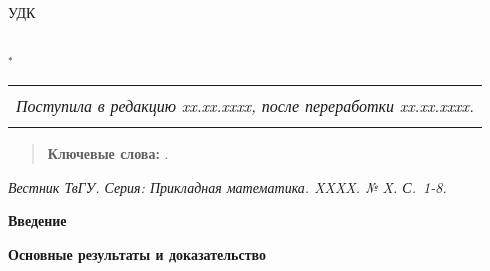 \documentclass[a4paper,twoside]{article}
\newcommand{\firstheader}[1]{\noindent\textbf{#1}\nopagebreak\bigskip}
\newcommand{\header}[1]{\bigskip\medskip\noindent\textbf{#1}\nopagebreak\bigskip}
\theoremstyle{theorem}
\theoremstyle{remark}
\newcommand{\pages}{1-8}
\begin{document}
\pagestyle{headings}
\makeatletter
\renewcommand{\@evenhead}{\raisebox{0pt}[\headheight][0pt]{\vbox{\hbox to\textwidth{\thepage\hfill \strut {\small }}\hrule}}}
\renewcommand{\@oddhead}{\raisebox{0pt}[\headheight][0pt]{\vbox{\hbox to\textwidth{{\small  }\hfill \strut\thepage}\hrule}}}
\makeatother

\thispagestyle{plain}
УДК 
\begin{center}
    {\bf }
\vspace{4mm}\par
    {\bf }\\
    $^{*}$ \\
\end{center}
\vspace{2mm}\par

\begin{center}
\renewcommand{\arraystretch}{0}
\begin{tabular}{c}
\hline
\rule{0pt}{2mm}\\
\small\it
Поступила в редакцию xx.xx.xxxx,
после переработки xx.xx.xxxx.
\\
\rule{0pt}{2mm}\\
\hline
\end{tabular}
\end{center}

\begin{quote}
    
\end{quote}

\begin{quote}
    {\bf Ключевые слова:} .
\end{quote}
{\small {\it Вестник ТвГУ. Серия: Прикладная математика. XXXX. № X. С.~\pages.}}
\vspace{5mm}



\firstheader{Введение}



\header{Основные результаты и доказательство}
\end{document}
